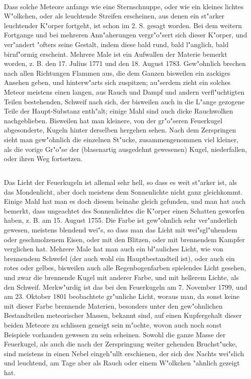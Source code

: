 \documentclass[a4paper, 11pt, oneside, polutonikogreek, german]{article}
\begin{document}
\paragraph{}
Dass solche Meteore anfangs wie eine Sternschnuppe, oder wie ein kleines lichtes W"olkchen, oder als leuchtende Streifen erscheinen, aus denen ein st"arker leuchtender K"orper fortgeht, ist schon im 2. S. gesagt worden. Bei dem weitern Fortgange und bei mehreren Ann"aherungen vergr"o"sert sich dieser K"orper, und ver"andert "ofters seine Gestalt, indem diese bald rund, bald l"anglich, bald birnf"ormig erscheint. Mehrere Male ist ein Aufwallen der Materie bemerkt worden, z. B. den 17. Julius 1771 und den 18. August 1783. Gew"ohnlich brechen nach allen Richtungen Flammen aus, die dem Ganzen bisweilen ein zackiges Ansehen geben, und hinterw"arts sich zuspitzen; au"serdem zieht ein solches Meteor meistens einen langen, aus Rauch und Dampf und andern verfl"uchtigten Teilen bestehenden, Schweif nach sich, der bisweilen auch in die L"ange gezogene Teile der Haupt-Substanz enth"alt; einige Mahl sind auch dicke Rauchwolken nachgeblieben. Bisweilen hat man kleinere, von der gr"o"seren Feuerkugel abgesonderte, Kugeln hinter derselben hergehen sehen. Nach dem Zerspringen sieht man gew"ohnlich die einzelnen St"ucke, zusammengenommen viel kleiner, als die vorige Gr"o"se der (blasenartig ausgedehnt gewesenen) Kugel, niederfallen, oder ihren Weg fortsetzen.
\subsection{}
\paragraph{}
Das Licht der Feuerkugeln ist allemal sehr hell, so dass es weit st"arker ist, als das Mondenlicht, aber doch meistens dem Sonnenlichte nicht ganz gleichkommt. Einige Mahl hat man es doch diesem beinahe gleich gefunden, und man hat auch bemerkt, dass ungeachtet des Sonnenlichtes die K"orper einen Schatten geworfen haben, z. B. am 15. August 1755. Die Farbe ist gew"ohnlich sehr ver"anderlich gewesen, meistens blendend wei"s, so dass man das Licht mit wei"sgl"uhendem oder geschmolzenem Eisen, oder mit den Blitzen, oder mit brennendem Kampfer verglichen hat. Mehrere Male hat man auch ein bl"auliches Licht, wie von brennendem Schwefel (der auch wohl ein Hauptbestandteil ist), oder auch ein rotes oder gelbes, bisweilen auch alle Regenbogenfarben spielendes Licht gesehen, und zwar die brennende Kugel mit anderer Farbe, und mit hellerem Lichte, als den Schweif. Merkw"urdig ist das bei den Feuerkugeln am 7. November 1799, und am 23. Oktober 1801 beobachtete gr"unliche Licht, woraus man, da sonst keine mit dieser Farbe brennende Materien, besonders unter den gew"ohnlichen Bestandteilen meteorischer Massen, bekannt sind, auf einen Kupfergehalt dieser beiden Meteore zu schlissen geneigt sein m"ochte, wovon auch noch sonst Beispiele vorhanden gewesen zu sein scheinen. Sowohl die ganze Masse der Feuerkugel, als auch die nach der Zerspringung weiter gehenden Bruchst"ucke, sind meistens in einen Nebel eingeh"ullt erschienen, der sich des Nachts wei"slich und leuchtend, am Tage aber als Rauch oder einem W"olkchen "ahnlich gezeigt hat.
\end{document}

